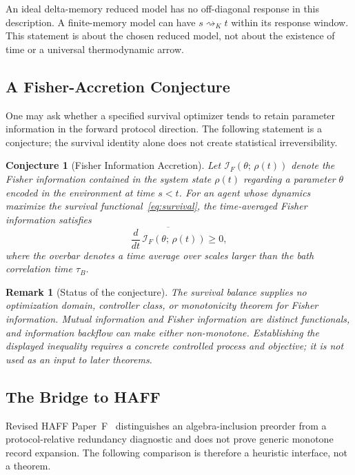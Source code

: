 \documentclass[12pt]{article}
\newtheorem{remark}[theorem]{Remark}
\newtheorem{conjecture}[theorem]{Conjecture}
\begin{document}
An ideal delta-memory reduced model has no off-diagonal response in this
description.  A finite-memory model can have
$s\rightsquigarrow_K t$ within its response window.  This statement is
about the chosen reduced model, not about the existence of time or a
universal thermodynamic arrow.

\subsection{A Fisher-Accretion Conjecture}

One may ask whether a specified survival optimizer tends to retain
parameter information in the forward protocol direction.  The following
statement is a conjecture; the survival identity alone does not create
statistical irreversibility.

\begin{conjecture}[Fisher Information Accretion]
\label{prop:fisher_accretion}
Let $\mathcal{I}_F(\theta;\, \rho(t))$ denote the Fisher
information contained in the system state $\rho(t)$ regarding
a parameter $\theta$ encoded in the environment at time $s < t$.
For an agent whose dynamics maximize the survival
functional~\eqref{eq:survival}, the time-averaged Fisher
information satisfies
\begin{equation}
\label{eq:fisher_accretion}
\overline{\frac{d}{dt}\,
\mathcal{I}_F(\theta;\, \rho(t))} \geq 0,
\end{equation}
where the overbar denotes a time average over scales larger
than the bath correlation time $\tau_B$.
\end{conjecture}

\begin{remark}[Status of the conjecture]
The survival balance supplies no optimization domain, controller class,
or monotonicity theorem for Fisher information.  Mutual information and
Fisher information are distinct functionals, and information backflow
can make either non-monotone.  Establishing the displayed inequality
requires a concrete controlled process and objective; it is not used as
an input to later theorems.
\end{remark}

\subsection{The Bridge to HAFF}

Revised HAFF Paper~F~\cite{Liu2026HAFF_F} distinguishes an
algebra-inclusion preorder from a protocol-relative redundancy
diagnostic and does not prove generic monotone record expansion.  The
following comparison is therefore a heuristic interface, not a theorem.
\end{document}
